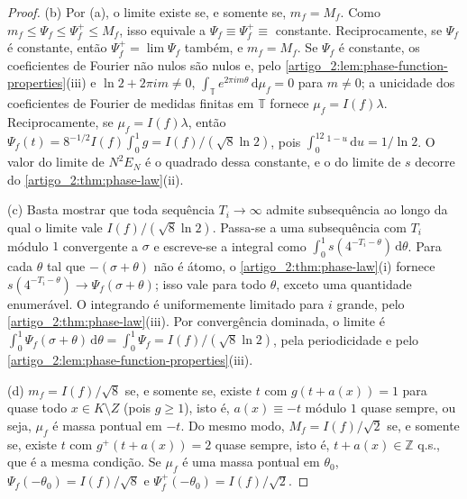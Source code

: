 \documentclass[12pt,a4paper]{article}
\theoremstyle{preciso}
\theoremstyle{definition}
\newcommand{\dd}{\,\mathrm{d}}
\theoremstyle{preciso}
\theoremstyle{preciso}
\theoremstyle{preciso}
\theoremstyle{preciso}
\theoremstyle{definition}
\theoremstyle{preciso}
\theoremstyle{definition}
\theoremstyle{preciso}
\theoremstyle{preciso}
\theoremstyle{definition}
\begin{document}
\begin{proof}
(b) Por (a), o limite existe se, e somente se, $m_f=M_f$. Como
$m_f\le\Psi_f\le\Psi_f^+\le M_f$, isso equivale a $\Psi_f\equiv\Psi_f^+\equiv$
constante. Reciprocamente, se $\Psi_f$ é constante, então $\Psi_f^+=\lim\Psi_f$ também,
e $m_f=M_f$. Se $\Psi_f$ é constante, os coeficientes de Fourier não nulos
são nulos e, pelo \cref{artigo_2:lem:phase-function-properties}(iii) e
$\ln2+2\pi im\ne0$, $\int_{\mathbb T}e^{2\pi im\theta}\dd\mu_f=0$ para $m\ne0$; a
unicidade dos coeficientes de Fourier de medidas finitas em $\mathbb T$ fornece
$\mu_f=I(f)\lambda$. Reciprocamente, se $\mu_f=I(f)\lambda$, então
$\Psi_f(t)=8^{-1/2}I(f)\int_0^1g=I(f)/(\sqrt8\ln2)$, pois
$\int_0^12^{1-u}\dd u=1/\ln2$. O valor do limite de $N^2E_N$ é o quadrado dessa
constante, e o do limite de $s$ decorre do \cref{artigo_2:thm:phase-law}(ii).

(c) Basta mostrar que toda sequência $T_i\to\infty$ admite subsequência ao longo
da qual o limite vale $I(f)/(\sqrt8\ln2)$. Passa-se a uma subsequência com $T_i$
módulo $1$ convergente a $\sigma$ e escreve-se a integral como
$\int_0^1s(4^{-T_i-\theta})\dd\theta$. Para cada $\theta$ tal que
$-(\sigma+\theta)$ não é átomo, o \cref{artigo_2:thm:phase-law}(i) fornece
$s(4^{-T_i-\theta})\to\Psi_f(\sigma+\theta)$; isso vale para todo $\theta$, exceto
uma quantidade enumerável. O integrando é uniformemente limitado para $i$
grande, pelo \cref{artigo_2:thm:phase-law}(iii). Por convergência dominada, o limite é
$\int_0^1\Psi_f(\sigma+\theta)\dd\theta=\int_0^1\Psi_f=I(f)/(\sqrt8\ln2)$, pela
periodicidade e pelo \cref{artigo_2:lem:phase-function-properties}(iii).

(d) $m_f=I(f)/\sqrt8$ se, e somente se, existe $t$ com $g(t+a(x))=1$ para quase
todo $x\in K\setminus Z$ (pois $g\ge1$), isto é, $a(x)\equiv-t$ módulo $1$ quase
sempre, ou seja, $\mu_f$ é massa pontual em $-t$. Do mesmo modo,
$M_f=I(f)/\sqrt2$ se, e somente se, existe $t$ com $g^+(t+a(x))=2$ quase
sempre, isto é, $t+a(x)\in\mathbb Z$ q.s., que é a mesma condição. Se $\mu_f$ é uma massa
pontual em $\theta_0$, $\Psi_f(-\theta_0)=I(f)/\sqrt8$ e
$\Psi_f^+(-\theta_0)=I(f)/\sqrt2$.
\end{proof}
\end{document}
